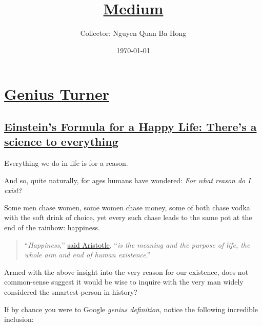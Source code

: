 \documentclass{book}
\title{\href{https://medium.com}{Medium}}
\author{Collector: Nguyen Quan Ba Hong}
\date{\today}
\numberwithin{equation}{section}
\begin{document}
\maketitle
\setcounter{secnumdepth}{6}
\setcounter{tocdepth}{6}
\tableofcontents


\part{\href{https://medium.com/@geniusturner360}{Genius Turner}}

\chapter{\href{https://medium.com/mind-cafe/einsteins-formula-for-a-happy-life-b29aff61a9c7}{Einstein's Formula for a Happy Life: There's a science to everything}}

Everything we do in life is for a reason.

And so, quite naturally, for ages humans have wondered: \textit{For what reason do I exist?}

%
Some men chase women, some women chase money, some of both chase vodka with the soft drink of choice, yet every such chase leads to the same pot at the end of the rainbow: happiness.

\begin{quotation}
    ``\textit{Happiness},'' \href{https://historyofeconomicthought.mcmaster.ca/aristotle/Ethics.pdf}{said Aristotle}, ``\textit{is the meaning and the purpose of life, the whole aim and end of human existence}.''
\end{quotation}
Armed with the above insight into the very reason for our existence, does not common-sense suggest it would be wise to inquire with the very man widely considered the smartest person in history?

%
If by chance you were to Google \textit{genius definition}, notice the following incredible inclusion:
\end{document}
